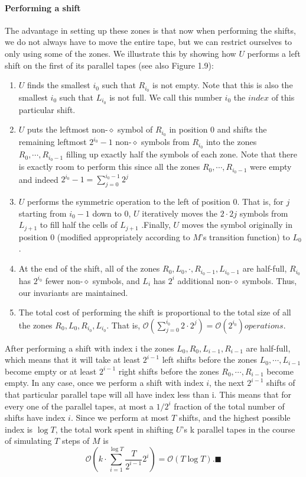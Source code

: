 \documentclass[a4paper,12pt]{article}
\begin{document}
\paragraph{Performing a shift}
The advantage in setting up these zones is that now when performing the shifts, we do
not always have to move the entire tape, but we can restrict ourselves to only using
some of the zones. We illustrate this by showing how $U$ performs a left shift on the first
of its parallel tapes (see also Figure 1.9):
\begin{enumerate}
\item $U$ finds the smallest $i_0$ such that $R_{i_0}$ is not empty. Note that this is also the smallest $i_0$ such that $L_{i_0}$ is not full. We call this number $i_0$ the $index$ of this particular shift.
\item $U$ puts the leftmost non-$\diamond$ symbol of $R_{i_0}$ in position 0 and shifts the remaining leftmost $2^{i_0} − 1$ non-$\diamond$ symbols from $R_{i_0}$ into the zones $R_0 ,\cdots , R_{i_0 −1}$ filling up exactly half the symbols of each zone. Note that there is exactly room to perform this since all the zones $R_0 ,\cdots , R_{i_0 −1}$ were empty and indeed $2^{i_0}-1 = \sum_{j=0}^{i_0-1} 2^{j}$
\item $U$ performs the symmetric operation to the left of position 0. That is, for $j$ starting from $i_0 −1$ down to 0, $U$ iteratively moves the $2 \cdot 2 j$ symbols from $L_{j+1}$ to fill half the cells of $L_{j+1}$ .Finally, $U$ moves the symbol originally in position 0 (modified appropriately according to $M$’s transition function) to $L_0$.
\item At the end of the shift, all of the zones $R_0 , L_0 , \cdot , R_{i_0 −1} , L_{i_0 −1}$ are half-full, $R_{i_0}$ has $2^{i_0}$ fewer non-$\diamond$ symbols, and $L_i$ has $2^i$ additional non-$\diamond$ symbols. Thus, our invariants are maintained.
\item
The total cost of performing the shift is proportional to the total size of all the zones $R_0 , L_0, R_{i_0} , L_{i_0}$. That is,  $\mathcal{O}( \sum_{j=0}^{i_0} 2 \cdot 2^{j}) = \mathcal{O}(2^{i_0}) operations.$
\end{enumerate}

After performing a shift with index i the zones $L_0 , R_0, L_{i-1} , R_{i-1}$ are half-full,
which means that it will take at least $2^{i − 1}$ left shifts before the zones $L_0, \cdots , L_{i-1}$ become empty or at least $2^{i − 1}$ right shifts before the zones $R_0, \cdots , R_{i-1}$ become
empty. In any case, once we perform a shift with index $i$, the next $2^{i − 1}$ shifts of that
particular parallel tape will all have index less than i. This means that for every one
of the parallel tapes, at most a $1/2^i$ fraction of the total number of shifts have index
$i$. Since we perform at most $T$ shifts, and the highest possible index is $\log T$, the total
work spent in shifting $U$’s k parallel tapes in the course of simulating $T$ steps of $M$ is
$$  \mathcal{O}( k \cdot \sum_{i=1}^{\log T} \frac{T}{2^{i-1}} 2^{i}) = \mathcal{O}(T\log T).\blacksquare $$
\end{document}
